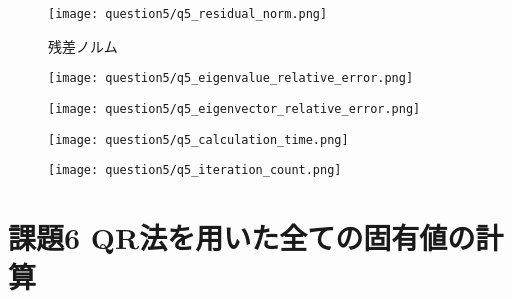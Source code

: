 \documentclass[uplatex,a4j]{jsarticle}
\begin{document}
\begin{figure}[ht]
  \centering
  \texttt{[image: question5/q5\_residual\_norm.png]}
  \caption{残差ノルム}
  \label{fig:q5_rn}
\end{figure}

\begin{figure}[htbp]
  \centering

  \begin{minipage}[t]{0.48\textwidth}
    \centering
    \texttt{[image: question5/q5\_eigenvalue\_relative\_error.png]}
    \label{fig:q5_val_re}
  \end{minipage}
  \hfill
  \begin{minipage}[t]{0.48\textwidth}
    \centering
    \texttt{[image: question5/q5\_eigenvector\_relative\_error.png]}
    \label{fig:q5_vec_re}
  \end{minipage}
  
\end{figure}

\begin{figure}[htbp]
  \centering

  \begin{minipage}[t]{0.48\textwidth}
    \centering
    \texttt{[image: question5/q5\_calculation\_time.png]}
    \label{fig:q5_ct}
  \end{minipage}
  \hfill
  \begin{minipage}[t]{0.48\textwidth}
    \centering
    \texttt{[image: question5/q5\_iteration\_count.png]}
    \label{fig:q5_ic}
  \end{minipage}
  
\end{figure}


\section{課題6 QR法を用いた全ての固有値の計算}
\label{sec:q6}
\end{document}
